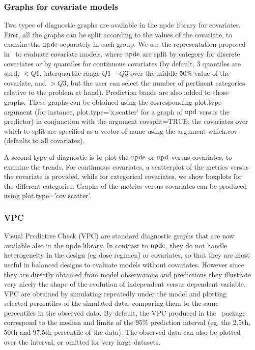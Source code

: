 \subsubsection{Graphs for covariate models} 

\hskip 18pt Two types of diagnostic graphs are available in the {\sf npde} library for covariates. First, all the graphs can be split according to the values of the covariate, to examine the ${\rm npde}$ separately in each group. We use the representation proposed in~\cite{Brendel10} to evaluate covariate models, where ${\rm npde}$ are split by category for discrete covariates or by quantiles for continuous covariates (by default, 3 quantiles are used, $<Q1$, interquartile range $Q1-Q3$ over the middle 50\% value of the covariate, and $>Q3$, but the user can select the number of pertinent categories relative to the problem at hand). Prediction bands are also added to those graphs. These graphs can be obtained using the corresponding {\sf plot.type} argument (for instance, {\sf plot.type='x.scatter'} for a graph of ${\rm npd}$ versus the predictor) in conjunction with the argument {\sf covsplit=TRUE}; the covariates over which to split are specified as a vector of name using the argument {\sf which.cov} (defaults to all covariates).

A second type of diagnostic is to plot the ${\rm npde}$ or ${\rm npd}$ versus covariates, to examine the trends. For continuous covariates, a scatterplot of the metrics versus the covariate is provided, while for categorical covariates, we show boxplots for the different categories. Graphs of the metrics versus covariates can be produced using {\sf plot.type='cov.scatter'}.

\subsubsection{VPC} 

\hskip 18pt Visual Predictive Check (VPC) are standard diagnostic graphs that are now available also in the {\sf npde} library. In contrast to ${\rm npde}$, they do not handle heterogeneity in the design (eg dose regimen) or covariates, so that they are most useful in balanced designs to evaluate models without covariates. However since they are directly obtained from model observations and predictions they illustrate very nicely the shape of the evolution of independent versus dependent variable. VPC are obtained by simulating repeatedly under the model and plotting selected percentiles of the simulated data, comparing them to the same percentiles in the observed data. By default, the VPC produced in the \npde~package correspond to the median and limits of the 95\% prediction interval (eg, the 2.5th, 50th and 97.5th percentile of the data). The observed data can also be plotted over the interval, or omitted for very large datasets.

